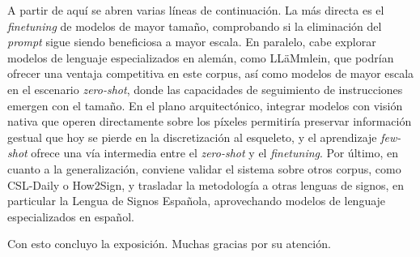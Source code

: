 \documentclass[11pt]{article}
\begin{document}
A partir de aquí se abren varias líneas de continuación. La más directa es el \textit{finetuning} de modelos de mayor tamaño, comprobando si la eliminación del \textit{prompt} sigue siendo beneficiosa a mayor escala. En paralelo, cabe explorar modelos de lenguaje especializados en alemán, como LL\"aMmlein, que podrían ofrecer una ventaja competitiva en este corpus, así como modelos de mayor escala en el escenario \textit{zero-shot}, donde las capacidades de seguimiento de instrucciones emergen con el tamaño. En el plano arquitectónico, integrar modelos con visión nativa que operen directamente sobre los píxeles permitiría preservar información gestual que hoy se pierde en la discretización al esqueleto, y el aprendizaje \textit{few-shot} ofrece una vía intermedia entre el \textit{zero-shot} y el \textit{finetuning}. Por último, en cuanto a la generalización, conviene validar el sistema sobre otros corpus, como CSL-Daily o How2Sign, y trasladar la metodología a otras lenguas de signos, en particular la Lengua de Signos Española, aprovechando modelos de lenguaje especializados en español.

Con esto concluyo la exposición. Muchas gracias por su atención.
\end{document}
